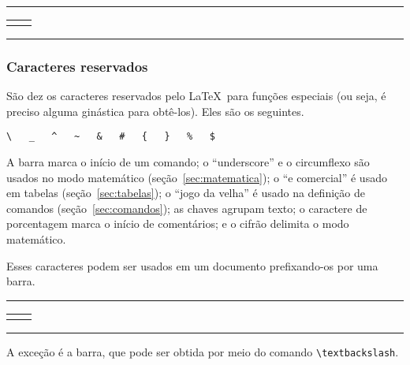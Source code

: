 \medskip
\begin{center}\footnotesize\hrule\smallskip
\begin{tabular}{c|c}
\begin{minipage}{.465\textwidth}

\end{minipage} &
\begin{minipage}{.465\textwidth}

\end{minipage}
\end{tabular}
\smallskip\hrule
\end{center}
\medskip

\subsubsection{Caracteres reservados}

São dez os caracteres reservados pelo \LaTeX\ para funções especiais
(ou seja, é preciso alguma ginástica para obtê-los). Eles são os seguintes.

\begin{center}
\verb'\   _   ^   ~   &   #   {   }   %   $'
\end{center}

A barra marca o início de um comando; o ``underscore'' e o circumflexo
são usados no modo matemático (seção~\ref{sec:matematica}); o ``e
comercial'' é usado em tabelas (seção~\ref{sec:tabelas}); o ``jogo da
velha'' é usado na definição de comandos (seção~\ref{sec:comandos});
as chaves agrupam texto; o caractere de porcentagem marca o início de
comentários; e o cifrão delimita o modo matemático.

Esses caracteres podem ser usados em um documento prefixando-os por
uma barra.

\medskip
\begin{center}\footnotesize\hrule\smallskip
\begin{tabular}{c|c}
\begin{minipage}{.465\textwidth}

\end{minipage} &
\begin{minipage}{.465\textwidth}
\centering 
\end{minipage}
\end{tabular}
\smallskip\hrule
\end{center}
\medskip

A exceção é a barra, que pode ser obtida  por meio do
comando \verb'\textbackslash'.
 

